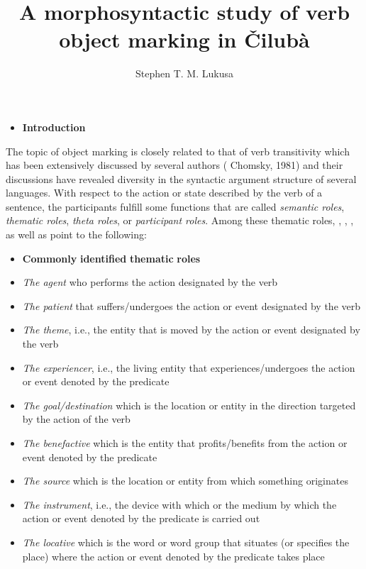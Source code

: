\documentclass[output=paper]{langscibook}
\author{Stephen T. M. Lukusa\affiliation{Gothenburg, Sweden}}
\title{A morphosyntactic study of verb object marking in Čilubà}
\begin{document}
\maketitle 


\begin{itemize}
\item \textbf{Introduction}
\end{itemize}

The topic of object marking is closely related to that of verb transitivity which has been extensively discussed by several authors ( Chomsky, 1981) and their discussions have revealed diversity in the syntactic argument structure of several languages. With respect to the action or state described by the verb of a sentence, the participants fulfill some functions that are called \textit{semantic roles}, \textit{thematic roles}, \textit{theta roles}, or \textit{participant roles}. Among these thematic roles, \citet{Borsley1991}, \citet{Chomsky1981}, \citet{CookNewson1996}, as well as \citet{Haegeman1991} point to the following:

\begin{itemize}
\item \textbf{Commonly} \textbf{identified} \textbf{thematic} \textbf{roles}
\end{itemize}

\begin{itemize}
\item \textit{The agent} who performs the action designated by the verb
\item \textit{The patient} that suffers/undergoes the action or event designated by the verb
\item \textit{The theme}, i.e., the entity that is moved by the action or event designated by the verb
\item \textit{The experiencer}, i.e., the living entity that experiences/undergoes the action or event denoted by the predicate
\item \textit{The goal/destination} which is the location or entity in the direction targeted by the action of the verb
\item \textit{The benefactive} which is the entity that profits/benefits from the action or event denoted by the predicate
\item \textit{The source} which is the location or entity from which something originates
\item \textit{The instrument}, i.e., the device with which or the medium by which the action or event denoted by the predicate is carried out
\item \textit{The locative} which is the word or word group that situates (or specifies the place) where the action or event denoted by the predicate takes place
\end{itemize}
\end{document}
